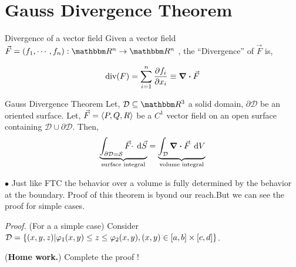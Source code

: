 \documentclass[Analysis-3]{subfiles}
\begin{document}
\section{Gauss Divergence Theorem}

\begin{Def}{Divergence of a vector field}{}
  \small  Given a vector field $\vec{F} = (f_1,\cdots, f_n) : \R^n \to \R^n $ , the ``Divergence'' of $\vec{F}$ is,

    \[\text{div}(F) = \sum_{i=1}^{n} \pdv{f_i}{x_i} \equiv \div \vec{F}\]
\end{Def}

 \begin{Thm}{Gauss Divergence Theorem}{}\label{GDT:1}
    Let, $\mathcal{D} \subseteq \R^3$ a solid domain, $\partial{\mathcal{D}}$ be an oriented surface. Let,  $\vec{F} = \left\langle {P}, {Q,R} \right\rangle$ be a $C^1$ vector field on an open surface containing $\mathcal{D} \cup \partial{\mathcal{D}}$. Then,
    \[
        \underbrace{\int_{\partial{\mathcal{D}} = \mathcal{S}} {\vec{F}\cdot} \hspace{0.1cm} \dd {\vec{S}}}_\text{surface integral} = \underbrace{\int_{\mathcal{D}} {\div \vec{F}} \hspace{0.1cm} \dd {V}}_\text{volume integral}   
    \]
 \end{Thm}

 $ \bullet $ Just like FTC the behavior over a volume is fully determined by the behavior at the boundary. Proof of this theorem is byond our reach.But we can see the proof for simple cases.

 \vspace{0.2cm}

 \textit{Proof.} (For a a simple case) Consider $\mathcal{D} = \qty{(x,y,z) | \varphi_1(x,y) \le z \le \varphi_2(x,y) , (x,y) \in [a,b]\times [c,d]}$. 

 (\textbf{Home work.}) Complete the proof !
   
\end{document}
